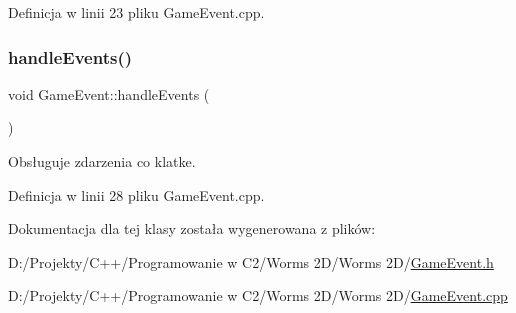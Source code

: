 Definicja w linii 23 pliku Game\+Event.\+cpp.

\mbox{\label{class_game_event_a73a56d31069079123f03f20855cb9bf0}} 
\subsubsection{\texorpdfstring{handle\+Events()}{handleEvents()}}
{\footnotesize\ttfamily void Game\+Event\+::handle\+Events (\begin{DoxyParamCaption}{ }\end{DoxyParamCaption})}



Obsługuje zdarzenia co klatke. 



Definicja w linii 28 pliku Game\+Event.\+cpp.



Dokumentacja dla tej klasy została wygenerowana z plików\+:\begin{DoxyCompactItemize}
\item 
D\+:/\+Projekty/\+C++/\+Programowanie w C2/\+Worms 2\+D/\+Worms 2\+D/\mbox{\hyperlink{_game_event_8h}{Game\+Event.\+h}}\item 
D\+:/\+Projekty/\+C++/\+Programowanie w C2/\+Worms 2\+D/\+Worms 2\+D/\mbox{\hyperlink{_game_event_8cpp}{Game\+Event.\+cpp}}\end{DoxyCompactItemize}
